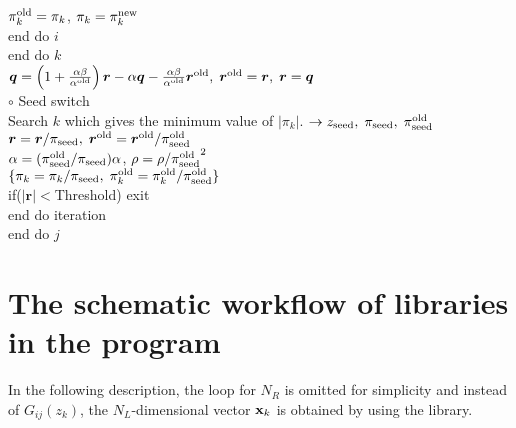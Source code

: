 \documentclass[12pt,titlepage]{article}
\begin{document}
$\pi_k^{\rm old} = \pi_k$, $\pi_k = \pi_k^{\rm new}$
\\\hspace{1.5cm}
end do $i$
\\\hspace{1.0cm}
end do $k$
\\\hspace{1.0cm}
${\boldsymbol q} = \left( 1 + \frac{\alpha \beta}{\alpha^{\rm old}} \right) {\boldsymbol r}
- \alpha {\boldsymbol q} - \frac{\alpha \beta}{\alpha^{\rm old}} {\boldsymbol r}^{\rm old},\; 
{\boldsymbol r}^{\rm old} = {\boldsymbol r},\; {\boldsymbol r} = {\boldsymbol q}$
\\\hspace{1.0cm}
$\circ$ Seed switch
\\\hspace{1.0cm}
Search $k$ which gives the minimum value of $|\pi_k|$.
$\rightarrow z_{\rm seed},\; \pi_{\rm seed},\; \pi_{\rm seed}^{\rm old} $
\\\hspace{1.0cm}
${\boldsymbol r} = {\boldsymbol r} / \pi_{\rm seed},\; 
{\boldsymbol r}^{\rm old} = {\boldsymbol r}^{\rm old} / \pi_{\rm seed}^{\rm old}$
\\\hspace{1.0cm}
$\alpha = (\pi_{\rm seed}^{\rm old} / \pi_{\rm seed}) \alpha$,
$\rho = \rho / {\pi_{\rm seed}^{\rm old}}^2$
\\\hspace{1.0cm}
$\{\pi_k = \pi_k/\pi_{\rm seed},\; \pi_k^{\rm old} = \pi_k^{\rm old}/\pi_{\rm seed}^{\rm old}\}$
\\\hspace{1.0cm}
if($|{\boldsymbol r}| < $Threshold) exit
\\\hspace{0.5cm}
end do iteration
\\
end do $j$

\section{The schematic workflow of libraries in the program}

In the following description, the loop for $N_R$ is omitted for simplicity and 
instead of $G_{i j}(z_k)$,
the $N_L$-dimensional vector ${\bf x}_{k}$ is obtained by using the library.
\end{document}

